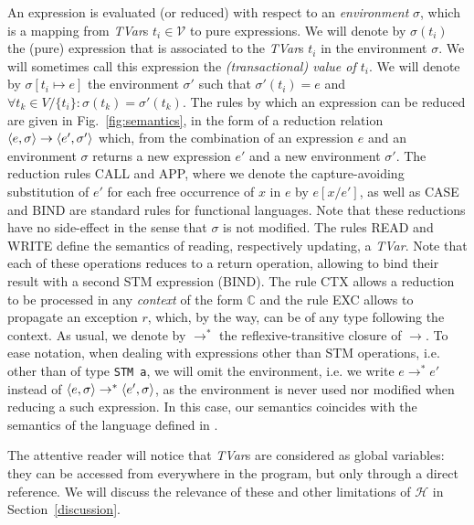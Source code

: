 \documentclass[submission,copyright,creativecommons]{eptcs}
\def\evalcont{\mathbb{C}}
\def\evalcont{\mathbb{C}}
\begin{document}
An expression is evaluated (or reduced) with respect to an \emph{environment} $\sigma$, which is a mapping from \emph{TVar}s $t_i \in \mathcal{V}$ to pure expressions. We will denote by $\sigma(t_i)$ the (pure) expression that is associated to the \emph{TVar}s $t_i$ in the environment $\sigma$. We will sometimes call this expression the \emph{(transactional) value of $t_i$}. We will denote by $\sigma[ t_i \mapsto e ]$ the environment $\sigma'$ such that $\sigma'(t_i)=e$ and $\forall t_k \in V/\{t_i\} : \sigma(t_k) = \sigma'(t_k)$. The rules by which an expression can be reduced are given in Fig.~\ref{fig:semantics}, in the form of a reduction relation~\cite{principles-program-analysis} $\langle e,\sigma \rangle \rightarrow \langle e',\sigma' \rangle$ which, from the combination of an expression $e$ and an environment $\sigma$ returns a new expression $e'$ and a new environment $\sigma'$. 
The reduction rules CALL and APP, where we denote the capture-avoiding substitution of $e'$ for each free occurrence of $x$ in $e$ by $e[x/e']$, as well as CASE and BIND are standard rules for functional languages. Note that these reductions have no side-effect in the sense that $\sigma$ is not modified. The rules READ and WRITE define the semantics of reading, respectively updating, a \emph{TVar}. Note that each of these operations reduces to a return operation, allowing to bind their result with a second STM expression (BIND). The rule CTX allows a reduction to be processed in any \emph{context} of the form $\evalcont$ and the rule EXC allows to propagate an exception $r$, which, by the way, can be of any type following the context.
As usual, we denote by $\rightarrow^{*}$ the  reflexive-transitive closure of $\rightarrow$. 
To ease notation, when dealing with expressions other than STM operations, i.e. other than of type \texttt{STM a}, we will omit the environment, i.e. we write $e \rightarrow^{*} e'$ instead of $\langle e,\sigma \rangle \rightarrow^{*} \langle e',\sigma \rangle$, as the environment is never used nor modified when reducing a such expression. In this case, our semantics coincides with the semantics of the language defined in \cite{static-contract-checking}.   


\newcommand{\diverges}[1]{\cpl{#1}\uparrow^{*}}
\newcommand{\divergespure}[1]{#1\uparrow^{*}}

The attentive reader will notice that 
\emph{TVar}s are considered as global variables: they can be accessed from everywhere in the program, but only through a direct reference. We will discuss the relevance of these and other limitations of $\mathcal{H}$ in Section~\ref{discussion}.
\end{document}
